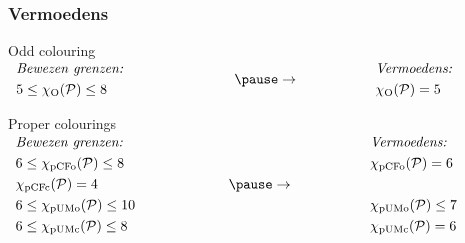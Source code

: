 \documentclass
[kulak] %
{kulakbeamer}
\begin{document}
	\begin{frame}
		\frametitle{Vermoedens}
		\vspace{0.5em}
		\begin{block}{Odd colouring}
			$
			\begin{array}{c@{\hspace{2.8cm}}c@{\hspace{2cm}}c}
				\begin{aligned}
					& \textit{Bewezen grenzen:} \\
					& 5 \leq \chi_{\mathrm{O}}(\mathcal{P}) \leq 8 \\
				\end{aligned}
				&
				\pause
				\Large \rightarrow
				&
				\begin{aligned}
					& \textit{Vermoedens:} \\
					& \chi_{\mathrm{O}}(\mathcal{P}) = 5 \\
				\end{aligned}
			\end{array}
			$
		\end{block}
		\pause
		\begin{block}{Proper colourings}
			$
			\begin{array}{c@{\hspace{2.35cm}}c@{\hspace{2cm}}c}
				\begin{aligned}
					& \textit{Bewezen grenzen:} \\
					& 6 \leq \chi_{\mathrm{pCFo}}(\mathcal{P}) \leq 8 \\
					& \chi_{\mathrm{pCFc}}(\mathcal{P}) = 4 \\
					& 6 \leq \chi_{\mathrm{pUMo}}(\mathcal{P}) \leq 10 \\
					& 6 \leq \chi_{\mathrm{pUMc}}(\mathcal{P}) \leq 8
				\end{aligned}
				&
				\pause
				\Large \rightarrow
				&
				\begin{aligned}
					& \textit{Vermoedens:} \\
					&\chi_{\mathrm{pCFo}}(\mathcal{P}) = 6 \\
					& \\
					&\chi_{\mathrm{pUMo}}(\mathcal{P}) \leq 7 \\
					&\chi_{\mathrm{pUMc}}(\mathcal{P}) = 6
				\end{aligned}
			\end{array}
			$
		\end{block}
	\end{frame}
	
\end{document}
